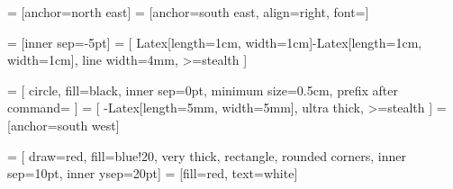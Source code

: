 
\usepackage{mwe}
\usepackage{blindtext}
\usepackage{relsize}
\usetikzlibrary{positioning	}
\usetikzlibrary{arrows.meta}
\usetikzlibrary{calc}


\newcommand{\macrotext}[1]{\color{macrocolor}#1}
\newcommand{\microtext}[1]{\color{microcolor}#1}
\newcommand{\black}[1]{\color{black}#1}

\newcommand{\FIGWIDTH}{17cm} %
\newcommand{\FIGHEIGHT}{12cm} %
\newcommand{\VERTFIGSEP}{4cm} %
\newcommand{\HORFIGSEP}{4cm} %
\newcommand{\BORDERWIDTH}{3mm} %
 = [anchor=north east]
 = [anchor=south east, align=right, font=\footnotesize]

 = [inner sep=-5pt]
 = [
		{Latex[length=1cm, width=1cm]}-{Latex[length=1cm, width=1cm]},
		line width=4mm,
		>=stealth
]

 = [
		circle,
		fill=black,
		inner sep=0pt,
		minimum size=0.5cm,
		prefix after command= {}
]
 = [
		-{Latex[length=5mm, width=5mm]},
		ultra thick,
		>=stealth
]
 = [anchor=south west]
\newcommand{\PPWIDTH}{2cm}
\newcommand{\PPHEIGHT}{2cm}

 = [
		draw=red,
		fill=blue!20,
		very thick,
    rectangle,
		rounded corners,
		inner sep=10pt,
		inner ysep=20pt]
 = [fill=red, text=white]

\newcommand{\xo}{\otimes}
\newcommand{\includedimensions}[1]{}
